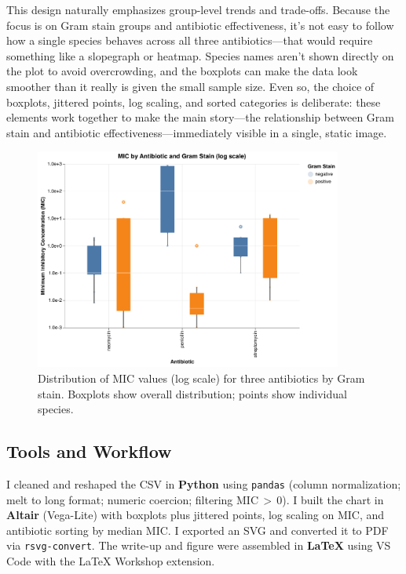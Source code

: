 \documentclass[12pt]{article}
\begin{document}
This design naturally emphasizes group-level trends and trade-offs. Because the focus is on Gram stain groups and antibiotic effectiveness, it’s not easy to follow how a single species behaves across all three antibiotics—that would require something like a slopegraph or heatmap. Species names aren’t shown directly on the plot to avoid overcrowding, and the boxplots can make the data look smoother than it really is given the small sample size. Even so, the choice of boxplots, jittered points, log scaling, and sorted categories is deliberate: these elements work together to make the main story—the relationship between Gram stain and antibiotic effectiveness—immediately visible in a single, static image.

\begin{figure}[h!]
  \centering
  \includegraphics[width=0.9\textwidth]{antibiotics_single_chart.pdf}
  \caption{Distribution of MIC values (log scale) for three antibiotics by Gram stain. Boxplots show overall distribution; points show individual species.}
\end{figure}

\subsection*{Tools and Workflow}
I cleaned and reshaped the CSV in \textbf{Python} using \texttt{pandas} (column normalization; melt to long format; numeric coercion; filtering MIC\,$>$\,0). I built the chart in \textbf{Altair} (Vega-Lite) with boxplots plus jittered points, log scaling on MIC, and antibiotic sorting by median MIC. I exported an SVG and converted it to PDF via \texttt{rsvg-convert}. The write-up and figure were assembled in \textbf{LaTeX} using VS Code with the LaTeX Workshop extension.
\end{document}
